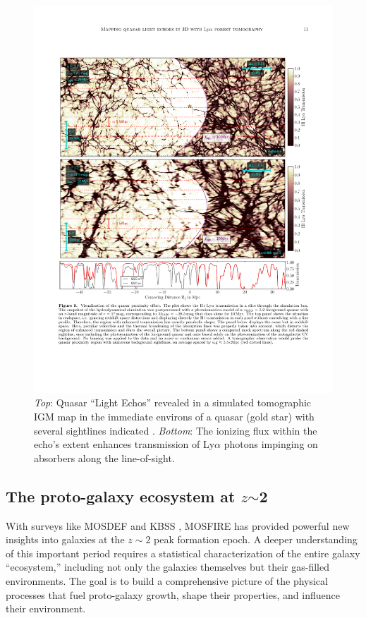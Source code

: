 \begin{figure}[h!]
%
\vskip -0.1in
%
\includegraphics[width=\textwidth]{figs/qso_LightEcho_v1.pdf}
%
\caption{{\it Top}: Quasar ``Light Echos'' revealed in a simulated tomographic IGM map in the immediate environs of a quasar (gold star) with several sightlines indicated \citep[from][]{2018arXiv181005156S}.  {\it Bottom}: The ionizing flux within the echo's extent enhances transmission of Ly$\alpha$ photons impinging on absorbers along the line-of-sight.}
%
\label{fig:LightEcho}
%
\end{figure}


\subsection{The proto-galaxy ecosystem at $z$$\sim$2}
\label{sec:z2galaxies}

With surveys like MOSDEF \citep{kriek15} and KBSS
\citep[e.g.,][]{steidel14}, MOSFIRE has provided powerful new
insights into galaxies at the $z \sim 2$ peak formation epoch. A
deeper understanding of this important period requires a statistical
characterization of the entire galaxy ``ecosystem,'' including not
only the galaxies themselves but their gas-filled environments. The
goal is to build a comprehensive picture of the physical processes
that fuel proto-galaxy growth, shape their properties, and influence
their environment.

